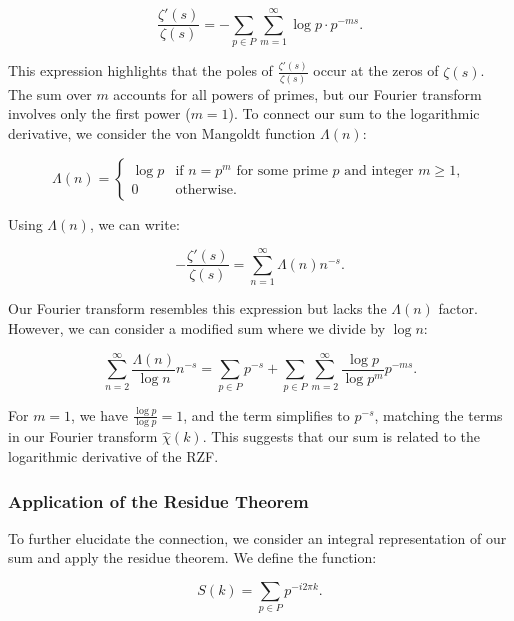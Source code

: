 \documentclass[11pt, oneside]{article}
\begin{document}
\begin{equation}
\frac{\zeta'(s)}{\zeta(s)} = -\sum_{p \in P} \sum_{m=1}^\infty \log p \cdot p^{-m s}.
\end{equation}

This expression highlights that the poles of $\frac{\zeta'(s)}{\zeta(s)}$ occur at the zeros of $\zeta(s)$. The sum over $m$ accounts for all powers of primes, but our Fourier transform involves only the first power ($m = 1$). To connect our sum to the logarithmic derivative, we consider the von Mangoldt function $\Lambda(n)$:

\begin{equation}
\Lambda(n) = \begin{cases}
\log p & \text{if } n = p^m \text{ for some prime } p \text{ and integer } m \geq 1, \\
0 & \text{otherwise}.
\end{cases}
\end{equation}

Using $\Lambda(n)$, we can write:

\begin{equation}
-\frac{\zeta'(s)}{\zeta(s)} = \sum_{n=1}^\infty \Lambda(n) n^{-s}.
\end{equation}

Our Fourier transform resembles this expression but lacks the $\Lambda(n)$ factor. However, we can consider a modified sum where we divide by $\log n$:

\begin{equation}
\sum_{n=2}^\infty \frac{\Lambda(n)}{\log n} n^{-s} = \sum_{p \in P} p^{-s} + \sum_{p \in P} \sum_{m=2}^\infty \frac{\log p}{\log p^m} p^{-m s}.
\end{equation}

For $m = 1$, we have $\frac{\log p}{\log p} = 1$, and the term simplifies to $p^{-s}$, matching the terms in our Fourier transform $\hat{\chi}(k)$. This suggests that our sum is related to the logarithmic derivative of the RZF.

\subsubsection{Application of the Residue Theorem}

To further elucidate the connection, we consider an integral representation of our sum and apply the residue theorem. We define the function:

\begin{equation}
S(k) = \sum_{p \in P} p^{-i 2\pi k}.
\end{equation}
\end{document}
